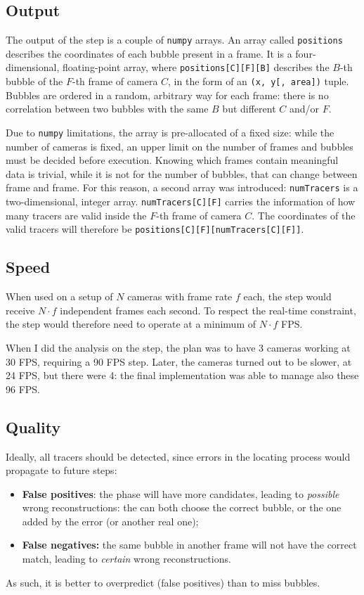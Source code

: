 \subsection{Output}
\label{sec:locate:output}

The output of the \locate* step is a couple of \texttt{numpy} arrays.
An array called \texttt{positions} describes the coordinates of each bubble present in a frame.
It is a four-dimensional, floating-point array, where \texttt{positions[C][F][B]} describes the $B$-th bubble of the $F$-th frame of camera $C$, in the form of an \texttt{(x, y[, area])} tuple.
Bubbles are ordered in a random, arbitrary way for each frame: there is no correlation between two bubbles with the same $B$ but different $C$ and/or $F$.

Due to \texttt{numpy} limitations, the array is pre-allocated of a fixed size: while the number of cameras is fixed, an upper limit on the number of frames and bubbles must be decided before execution.
Knowing which frames contain meaningful data is trivial, while it is not for the number of bubbles, that can change between frame and frame.
For this reason, a second array was introduced: \texttt{numTracers} is a two-dimensional, integer array.
\texttt{numTracers[C][F]} carries the information of how many tracers are valid inside the $F$-th frame of camera $C$.
The coordinates of the valid tracers will therefore be \texttt{positions[C][F][numTracers[C][F]]}.

\subsection{Speed}

When used on a setup of $N$ cameras with frame rate $f$ each, the \locate* step would receive $N{\cdot}f$ independent frames each second.
To respect the real-time constraint, the \locate* step would therefore need to operate at a minimum of $N{\cdot}f$ FPS.

When I did the analysis on the \locate* step, the plan was to have 3 cameras working at 30 FPS, requiring a 90 FPS \locate* step.
Later, the cameras turned out to be slower, at 24 FPS, but there were 4: the final \locate* implementation was able to manage also these 96 FPS.

\subsection{Quality}

Ideally, all tracers should be detected, since errors in the locating process would propagate to future steps:
\begin{itemize}
	\itemsep 0em
	\item \textbf{False positives}: the \match* phase will have more candidates, leading to \textit{possible} wrong reconstructions: the \match* can both choose the correct bubble, or the one added by the error (or another real one);
	\item \textbf{False negatives:} the same bubble in another frame will not have the correct match, leading to \textit{certain} wrong reconstructions.
\end{itemize}
As such, it is better to overpredict (false positives) than to miss bubbles.

